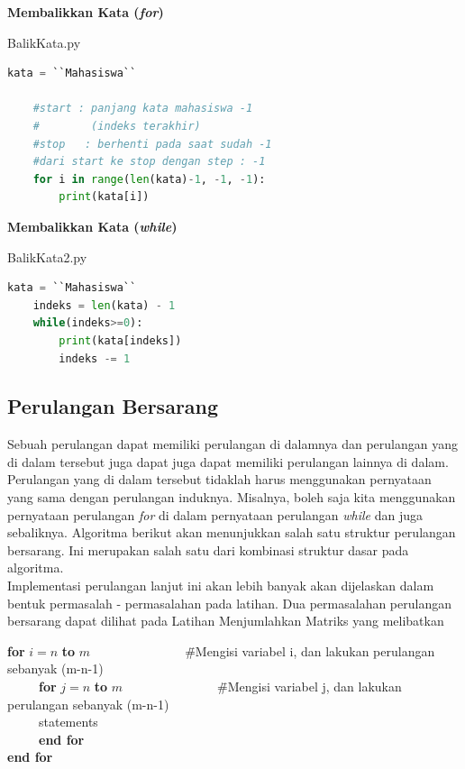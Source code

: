 \begin{enumerate}
\begin{contoh}
	\textbf{Membalikkan Kata (\textit{for})}
\begin{listprog}{BalikKata.py}
\label{lst:BalikKata}
\begin{lstlisting}[language=Python]
	kata = ``Mahasiswa``
	
	#start : panjang kata mahasiswa -1 
	#        (indeks terakhir)
	#stop	: berhenti pada saat sudah -1
	#dari start ke stop dengan step : -1
	for i in range(len(kata)-1, -1, -1):
		print(kata[i])
\end{lstlisting}
\end{listprog}
\end{contoh}

\begin{contoh}
	\textbf{Membalikkan Kata (\textit{while})}
\begin{listprog}{BalikKata2.py}
\label{lst:BalikKata2}
\begin{lstlisting}[language=Python]
	kata = ``Mahasiswa``
	indeks = len(kata) - 1
	while(indeks>=0):
		print(kata[indeks])
		indeks -= 1
	\end{lstlisting}
\end{listprog}
\end{contoh}
\end{enumerate}

\FloatBarrier
\subsection{Perulangan Bersarang}
Sebuah perulangan dapat memiliki perulangan di dalamnya dan perulangan yang di dalam tersebut juga dapat juga dapat memiliki perulangan lainnya di dalam. Perulangan yang di dalam tersebut tidaklah harus menggunakan pernyataan yang sama dengan perulangan induknya. Misalnya, boleh saja kita menggunakan pernyataan perulangan \textit{for} di dalam pernyataan perulangan \textit{while} dan juga sebaliknya. Algoritma berikut akan menunjukkan salah satu struktur perulangan bersarang. Ini merupakan salah satu dari kombinasi struktur dasar pada algoritma. \\

Implementasi perulangan lanjut ini akan lebih banyak akan dijelaskan dalam bentuk permasalah - permasalahan pada latihan. Dua permasalahan perulangan bersarang dapat dilihat pada Latihan Menjumlahkan Matriks yang melibatkan 


\begin{tabbing}
\textbf{for} $i=n$ \textbf{to} $m$~~~~~~~~~~~~~~~\=\#Mengisi variabel i, dan lakukan perulangan sebanyak (m-n-1)\\
~~~~~\textbf{for} $j=n$ \textbf{to} $m$~~~~~~~~~~~~~~~\=\#Mengisi variabel j, dan lakukan perulangan sebanyak (m-n-1)\\
~~~~~statements\\
~~~~~\textbf{end for}\\
\textbf{end for}
\end{tabbing}






	
 
